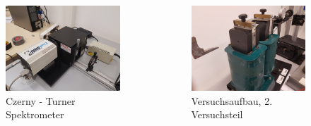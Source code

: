         \begin{myframe}{\subsecname}
            \begin{columns}
                \begin{column}{0.48\textwidth}
                    \begin{figure}
                        \includegraphics[width=0.8\linewidth]{img/IMG-20180102-WA0002.jpg}
                        \caption{Czerny - Turner Spektrometer}
                    \end{figure}
                \end{column}
                \begin{column}{0.48\textwidth}
                    \begin{figure}
                        \includegraphics[width=0.8\linewidth]{img/IMG-20180102-WA0003.jpg}
                        \caption{Versuchsaufbau, 2. Versuchsteil}
                    \end{figure}
                \end{column}
            \end{columns}
        \end{myframe}

